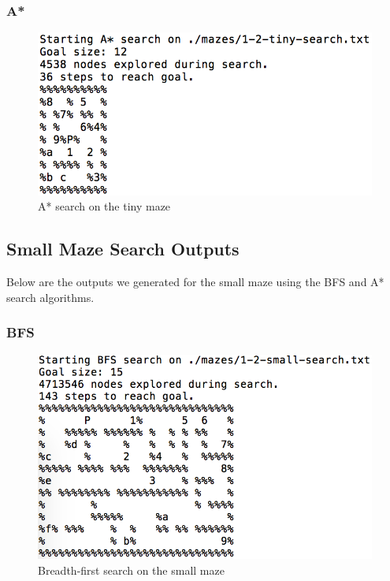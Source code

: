 \documentclass[titlepage]{article}
\begin{document}
\newpage

\subsubsection*{A*}
\begin{figure}[h!]
\includegraphics[width=\linewidth]{astartiny1-2.png}
\caption{A* search on the tiny maze}
\label{fig:astartiny}
\end{figure}

\newpage

\subsection*{Small Maze Search Outputs}
Below are the outputs we generated for the small maze using the BFS and A* search algorithms. 


\subsubsection*{BFS}
\begin{figure}[h!]
\includegraphics[width=\linewidth]{bfssmall1-2.png}
\caption{Breadth-first search on the small maze}
\label{fig:BFSsmall}
\end{figure}
\end{document}
